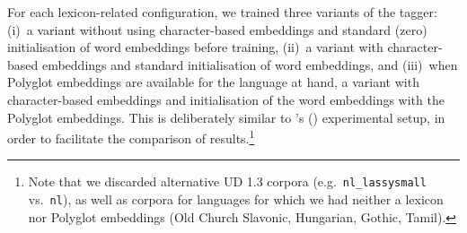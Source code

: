 \documentclass[11pt,a4paper]{article}
\begin{document}
For each lexicon-related configuration, we trained three variants of the tagger: (i)~a variant without using
character-based embeddings and standard (zero) initialisation of word embeddings before training, (ii)~a variant with
character-based embeddings and standard initialisation of word embeddings, and (iii)~when Polyglot embeddings are
available for the language at hand, a variant with character-based embeddings and initialisation of the word embeddings
with the Polyglot embeddings. This is deliberately similar to \citeauthor{plank16}'s (\citeyear{plank16}) experimental
setup, in order to facilitate the comparison of results.\footnote{Note that we discarded alternative UD 1.3 corpora
  (e.g.~{\tt nl\_lassysmall} vs.~{\tt nl}), as well as corpora for languages for which we had neither a
  lexicon nor Polyglot embeddings (Old Church Slavonic, Hungarian, Gothic, Tamil).}
\end{document}

